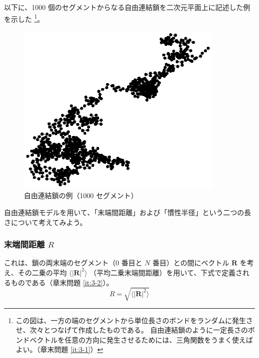 \documentclass[uplatex,dvipdfmx,a4paper,11pt, titlepage]{jsarticle}
\begin{document}
以下に、1000 個のセグメントからなる自由連結鎖を二次元平面上に記述した例を示した
\footnote
{
この図は、一方の端のセグメントから単位長さのボンドをランダムに発生させ、次々とつなげて作成したものである。
自由連結鎖のように一定長さのボンドベクトルを任意の方向に発生させるためには、三角関数をうまく使えばよい。（章末問題 \ref{it:3-1}）
}。
\begin{figure}[htb]
	\begin{center}
		\includegraphics[width=10cm]{figure/RF.eps}
		\caption{自由連結鎖の例（1000 セグメント）}
		\label{fig: RF}
	\end{center}
\end{figure}

自由連結鎖モデルを用いて、「末端間距離」および「慣性半径」という二つの長さについて考えてみよう。

\subsubsection{末端間距離 $R$}

これは、鎖の両末端のセグメント（0 番目と $N$ 番目）との間にベクトル $\bm{R}$ を考え、その二乗の平均 $\langle |\bm{R}|^2 \rangle$ （平均二乗末端間距離）を用いて、下式で定義されるものである（章末問題 \ref{it:3-2}）。
\begin{equation}
R=\sqrt{\langle |\bm{R}|^2 \rangle}
\end{equation}
\end{document}
